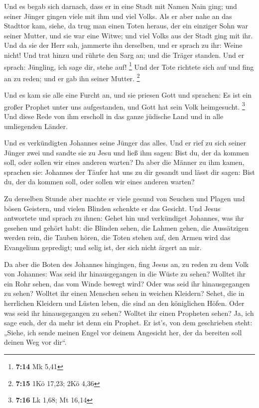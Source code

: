  Und es begab sich darnach, dass er in eine Stadt mit
Namen Nain ging; und seiner Jünger gingen viele mit ihm und viel Volks.
 Als er aber nahe an das Stadttor kam, siehe, da trug man
einen Toten heraus, der ein einziger Sohn war seiner Mutter, und sie war
eine Witwe; und viel Volks aus der Stadt ging mit ihr. 
Und da sie der Herr sah, jammerte ihn derselben, und er sprach zu ihr:
Weine nicht!  Und trat hinzu und rührte den Sarg an; und
die Träger standen. Und er sprach: Jüngling, ich sage dir, stehe auf!
\footnote{\textbf{7:14} Mk 5,41}  Und der Tote richtete
sich auf und fing an zu reden; und er gab ihn seiner Mutter. \footnote{\textbf{7:15}
  1Kö 17,23; 2Kö 4,36}

 Und es kam sie alle eine Furcht an, und sie priesen Gott
und sprachen: Es ist ein großer Prophet unter uns aufgestanden, und Gott
hat sein Volk heimgesucht. \footnote{\textbf{7:16} Lk 1,68; Mt 16,14}
 Und diese Rede von ihm erscholl in das ganze jüdische
Land und in alle umliegenden Länder.

 Und es verkündigten Johannes seine Jünger das alles. Und
er rief zu sich seiner Jünger zwei  und sandte sie zu
Jesu und ließ ihm sagen: Bist du, der da kommen soll, oder sollen wir
eines anderen warten?  Da aber die Männer zu ihm kamen,
sprachen sie: Johannes der Täufer hat uns zu dir gesandt und lässt dir
sagen: Bist du, der da kommen soll, oder sollen wir eines anderen
warten?

 Zu derselben Stunde aber machte er viele gesund von
Seuchen und Plagen und bösen Geistern, und vielen Blinden schenkte er
das Gesicht.  Und Jesus antwortete und sprach zu ihnen:
Gehet hin und verkündiget Johannes, was ihr gesehen und gehört habt: die
Blinden sehen, die Lahmen gehen, die Aussätzigen werden rein, die Tauben
hören, die Toten stehen auf, den Armen wird das Evangelium gepredigt;
 und selig ist, der sich nicht ärgert an mir.

 Da aber die Boten des Johannes hingingen, fing Jesus an,
zu reden zu dem Volk von Johannes: Was seid ihr hinausgegangen in die
Wüste zu sehen? Wolltet ihr ein Rohr sehen, das vom Winde bewegt wird?
 Oder was seid ihr hinausgegangen zu sehen? Wolltet ihr
einen Menschen sehen in weichen Kleidern? Sehet, die in herrlichen
Kleidern und Lüsten leben, die sind an den königlichen Höfen.
 Oder was seid ihr hinausgegangen zu sehen? Wolltet ihr
einen Propheten sehen? Ja, ich sage euch, der da mehr ist denn ein
Prophet.  Er ist's, von dem geschrieben steht: „Siehe,
ich sende meinen Engel vor deinem Angesicht her, der da bereiten soll
deinen Weg vor dir``.

